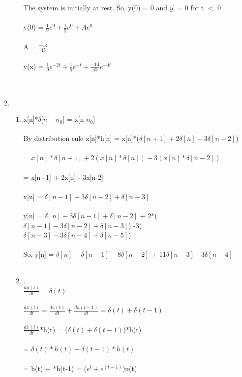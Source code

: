 \documentclass[10pt,a4paper, margin=1in]{article}
\begin{document}
\begin{enumerate}
\begin{enumerate}
    The system is initially at rest. So, y(0) = 0 and $y^{'}$ = 0 for t $<$ 0\\\\
    y(0) = $ \frac{1}{9}e^{0} + \frac{1}{5}e^{0} +  Ae^{0}$\\\\
    A = $\frac{-14}{45}$\\\\
    
     y(x) = $ \frac{1}{9}e^{-2t} + \frac{1}{5}e^{-t} +  \frac{-14}{45}e^{-4t}$\\\\\\
    
    
    
   

  
    
    \end{enumerate}
\newpage

\item      
    \begin{enumerate}
    \item %
      x[n]*$\delta[n- n_{0}$] = x[n-$n_{0}$]\\\\
      By distribution rule x[n]*h[n] = x[n]*($\delta[n+1] +2\delta[n] -3\delta[n-2]$)\\\\
      = $x[n]*\delta[n+1] +2(x[n]*\delta[n]) -3(x[n]*\delta[n-2])$ \\\\
      = x[n+1] + 2x[n] - 3x[n-2]\\\\
      x[n] = $\delta[n-1] - 3\delta[n-2] + \delta[n-3]$\\\\
      y[n] =  $\delta[n] - 3\delta[n-1] + \delta[n-2]$ + 2*( $\delta[n-1] - 3\delta[n-2] + \delta[n-3]$) -3( $\delta[n-3] - 3\delta[n-4] + \delta[n-5]$)\\\\
      So,  y[n] =  $\delta[n] - \delta[n-1] - 8\delta[n-2]$ + 11$\delta[n-3]$ - 3$\delta[n-4]$\\\\
       
        
        
    \item 
    
     .\\
        $\frac{du(t)}{dt} = \delta(t)$ \\\\
        $\frac{dx(t)}{dt} = \frac{du(t)}{dt} + \frac{du(t-1)}{dt} = \delta(t) + \delta(t-1) $  \\\\
        $\frac{dx(t)}{dt}$*h(t) = ($\delta(t) + \delta(t-1)$)*h(t) \\\\
        = $\delta(t)*h(t) + \delta(t-1)*h(t)$\\\\
        = h(t) + *h(t-1) = ($e^t + e^{(t-1)}$)u(t)


\end{enumerate}
\end{enumerate}
\end{document}
